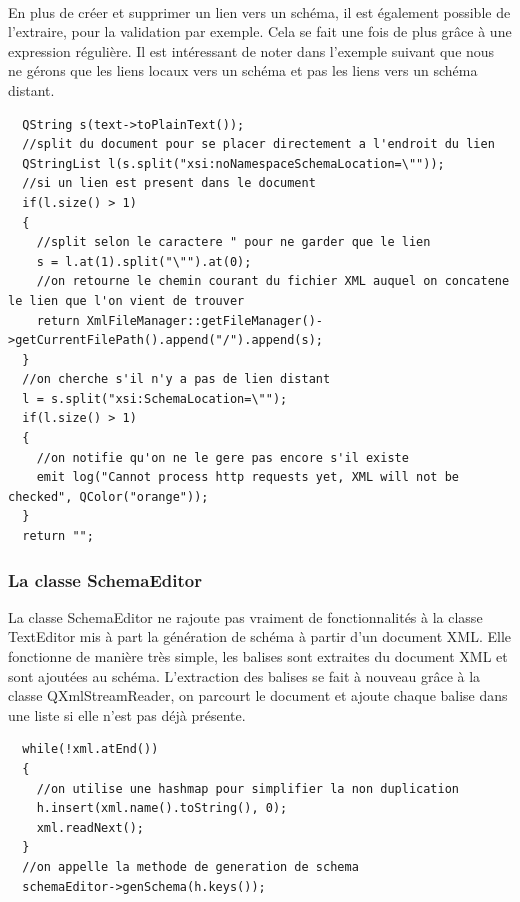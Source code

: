 \paragraph{}
En plus de créer et supprimer un lien vers un schéma, il est également possible de l'extraire, pour la validation par exemple. Cela se fait une fois de plus grâce à une expression régulière. Il est intéressant de noter dans l'exemple suivant que nous ne gérons que les liens locaux vers un schéma et pas les liens vers un schéma distant.
\begin{lstlisting}
  QString s(text->toPlainText());
  //split du document pour se placer directement a l'endroit du lien
  QStringList l(s.split("xsi:noNamespaceSchemaLocation=\""));
  //si un lien est present dans le document
  if(l.size() > 1)
  {
    //split selon le caractere " pour ne garder que le lien
    s = l.at(1).split("\"").at(0);
    //on retourne le chemin courant du fichier XML auquel on concatene le lien que l'on vient de trouver
    return XmlFileManager::getFileManager()->getCurrentFilePath().append("/").append(s);
  }
  //on cherche s'il n'y a pas de lien distant
  l = s.split("xsi:SchemaLocation=\"");
  if(l.size() > 1)
  {
    //on notifie qu'on ne le gere pas encore s'il existe
    emit log("Cannot process http requests yet, XML will not be checked", QColor("orange"));
  }
  return "";
\end{lstlisting}
\paragraph{}
\subsubsection{La classe SchemaEditor}
La classe SchemaEditor ne rajoute pas vraiment de fonctionnalités à la classe TextEditor mis à part la génération de schéma à partir d'un document XML. Elle fonctionne de manière très simple, les balises sont extraites du document XML et sont ajoutées au schéma. L'extraction des balises se fait à nouveau grâce à la classe QXmlStreamReader, on parcourt le document et ajoute chaque balise dans une liste si elle n'est pas déjà présente.

\begin{lstlisting}
  while(!xml.atEnd())
  {
    //on utilise une hashmap pour simplifier la non duplication
    h.insert(xml.name().toString(), 0);
    xml.readNext();
  }
  //on appelle la methode de generation de schema
  schemaEditor->genSchema(h.keys());
\end{lstlisting}
